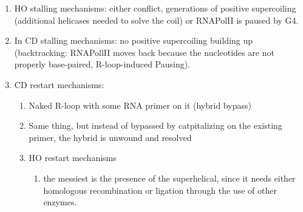 \begin{enumerate}
\def\labelenumi{\arabic{enumi}.}
\tightlist
\item
  HO stalling mechanisms: either conflict, generations of
  positive supercoiling (additional helicases needed to solve the coil)
  or RNAPolII is paused by G4.
\item
  In CD stalling mechanisms: no positive supercoiling building up
  (backtracking: RNAPollII moves back because the nucleotides are not
  properly base-paired, R-loop-induced Pausing).
\item
  CD restart mechanisms:

  \begin{enumerate}
  \def\labelenumii{\arabic{enumii}.}
  \tightlist
  \item
    Naked R-loop with some RNA primer on it (hybrid bypass)
  \item
    Same thing, but instead of bypassed by catpitalizing on the existing
    primer, the hybrid is unwound and resolved
  \item
    HO restart mechanisms

    \begin{enumerate}
    \def\labelenumiii{\arabic{enumiii}.}
    \tightlist
    \item
      the messiest is the presence of the superhelical, since it needs
      either homologous recombination or ligation through the use of other
      enzymes.
     
    \end{enumerate}
  \end{enumerate}
\end{enumerate}


